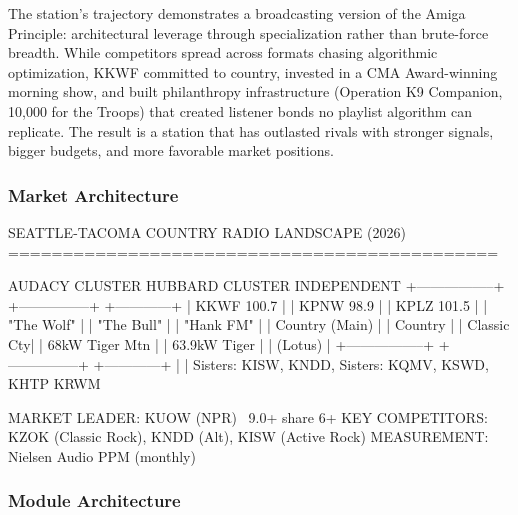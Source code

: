 \documentclass[11pt,letterpaper]{article}
\begin{document}
The station's trajectory demonstrates a broadcasting version of the Amiga Principle: architectural leverage through specialization rather than brute-force breadth. While competitors spread across formats chasing algorithmic optimization, KKWF committed to country, invested in a CMA Award-winning morning show, and built philanthropy infrastructure (Operation K9 Companion, 10,000 for the Troops) that created listener bonds no playlist algorithm can replicate. The result is a station that has outlasted rivals with stronger signals, bigger budgets, and more favorable market positions.

\subsubsection{Market Architecture}

\begin{asciibox}
SEATTLE-TACOMA COUNTRY RADIO LANDSCAPE (2026)
=============================================

  AUDACY CLUSTER              HUBBARD CLUSTER        INDEPENDENT
  +-----------------+         +---------------+      +------------+
  | KKWF 100.7      |         | KPNW 98.9     |      | KPLZ 101.5 |
  | "The Wolf"      |         | "The Bull"     |      | "Hank FM"  |
  | Country (Main)  |         | Country        |      | Classic Cty|
  | 68kW Tiger Mtn  |         | 63.9kW Tiger   |      | (Lotus)    |
  +-----------------+         +---------------+      +------------+
        |                           |
  Sisters: KISW, KNDD,       Sisters: KQMV,
  KSWD, KHTP                 KRWM

  MARKET LEADER: KUOW (NPR) ~9.0+ share 6+
  KEY COMPETITORS: KZOK (Classic Rock), KNDD (Alt), KISW (Active Rock)
  MEASUREMENT: Nielsen Audio PPM (monthly)
\end{asciibox}

\subsubsection{Module Architecture}
\end{document}
